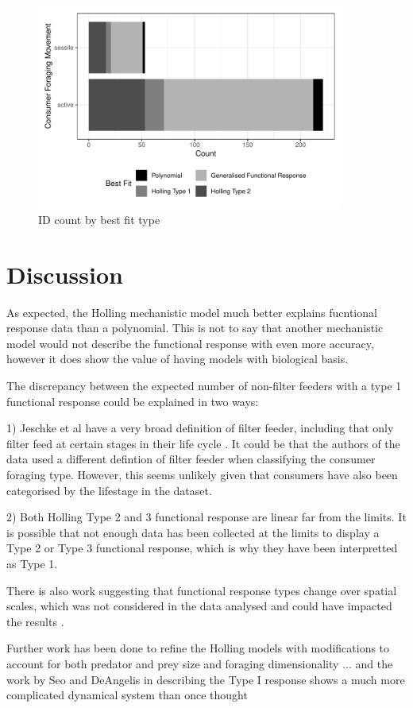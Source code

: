 \documentclass[11pt, a4paper, titlepage]{article}
\begin{document}
\begin{figure}[ht!]
	\centering\includegraphics[width=0.9\textwidth]{../Results/ConForaging_Comparison_Barchart.pdf}
	\caption{ID count by best fit type}
\end{figure}

\section{Discussion}

As expected, the Holling mechanistic model much better explains fucntional response data than a polynomial. This is not to say that another mechanistic model would not describe the functional response with even more accuracy, however it does show the value of having models with biological basis.

The discrepancy between the expected number of non-filter feeders with a type 1 functional response could be explained in two ways:

1) Jeschke et al have a very broad definition of filter feeder, including that only filter feed at certain stages in their life cycle \parencite{Jeschke2004}. It could be that the authors of the data used a different defintion of filter feeder when classifying the consumer foraging type. However, this seems unlikely given that consumers have also been categorised by the lifestage in the dataset.

2) Both Holling Type 2 and 3 functional response are linear far from the limits. It is possible that not enough data has been collected at the limits to display a Type 2 or Type 3 functional response, which is why they have been interpretted as Type 1.

There is also work suggesting that functional response types change over spatial scales, which was not considered in the data analysed and could have impacted the results \parencite{Rincon2017}.

Further work has been done to refine the Holling models \parencite{Pawar2012, Seo2011, Aljetlawi2004} with modifications to account for both predator and prey size \parencite{Aljetlawi2004} and foraging dimensionality \parencite{Pawar2012}... and the work by Seo and DeAngelis in describing the Type I response shows a much more complicated dynamical system than once thought \parencite{Seo2011}

\newpage
\printbibliography
\end{document}
